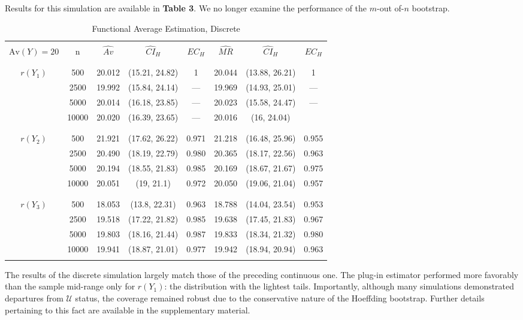 \documentclass[12pt]{amsart}
\theoremstyle{plain}%
\theoremstyle{definition}
\theoremstyle{remark}
\numberwithin{equation}{section}
\begin{document}
Results for this simulation are available in \textbf{Table 3}. We no longer examine the performance of the $m$-out of-$n$ bootstrap.
\begin{table}[H]
\caption{Functional Average Estimation, Discrete}
\centering
\begin{adjustbox}{width=1\textwidth}
\begin{tabular}{cc|ccc|ccc}
  \hline
    \\[-3.5\smallskipamount]
$\text{Av}(Y) = 20$ & n & $\hat{Av}$ & $\hat{CI}_{H}$ & $EC_{H}$ & $\hat{MR}$ & $\hat{CI}_{H}$ & $EC_{H}$ \\ 
  \\[-3.5\smallskipamount]
  \hline
    \\[-3.5\smallskipamount]
$r(Y_1)$ & 500 & 20.012 & (15.21, 24.82) & 1 & 20.044 & (13.88, 26.21) & 1 \\ 
   & 2500 & 19.992 & (15.84, 24.14) & --- & 19.969 & (14.93, 25.01) & --- \\ 
   & 5000 & 20.014 & (16.18, 23.85) & --- & 20.023 & (15.58, 24.47) & --- \\ 
   & 10000 & 20.020 & (16.39, 23.65) & --- & 20.016 & (16, 24.04) \\ 
     \\[-3.5\smallskipamount]
   \hline
     \\[-3.5\smallskipamount]
 $r(Y_2)$  & 500 & 21.921 & (17.62, 26.22) & 0.971 & 21.218 & (16.48, 25.96) & 0.955 \\ 
   & 2500 & 20.490 & (18.19, 22.79) & 0.980 & 20.365 & (18.17, 22.56) & 0.963 \\ 
   & 5000 & 20.194 & (18.55, 21.83) & 0.985 & 20.169 & (18.67, 21.67) & 0.975 \\ 
   & 10000 & 20.051 & (19, 21.1) & 0.972 & 20.050 & (19.06, 21.04) & 0.957  \\ 
     \\[-3.5\smallskipamount]
   \hline
     \\[-3.5\smallskipamount]
 $r(Y_3)$  & 500 & 18.053 & (13.8, 22.31) & 0.963 & 18.788 & (14.04, 23.54) & 0.953 \\ 
   & 2500 & 19.518 & (17.22, 21.82) & 0.985 & 19.638 & (17.45, 21.83) & 0.967 \\ 
   & 5000 & 19.803 & (18.16, 21.44) & 0.987 & 19.833 & (18.34, 21.32) & 0.980 \\ 
   & 10000 & 19.941 & (18.87, 21.01) & 0.977 & 19.942 & (18.94, 20.94) & 0.963 \\ 
     \\[-3.5\smallskipamount]
   \hline
\end{tabular}
\end{adjustbox}
\end{table}
The results of the discrete simulation largely match those of the preceding continuous one. The plug-in estimator performed more favorably than the sample mid-range only for $r(Y_1)$: the distribution with the lightest tails. Importantly, although many simulations demonstrated departures from $\mathcal{U}$ status, the coverage remained robust due to the conservative nature of the Hoeffding bootstrap. Further details pertaining to this fact are available in the supplementary material.
\end{document}
